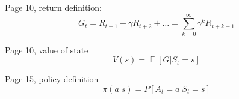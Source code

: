 \documentclass{article}
\DeclareMathOperator{\E}{\mathbb{E}}
\begin{document}
Page 10, return definition:
\begin{equation*}
G_t = R_{t+1}+\gamma R_{t+2}+\ldots = \sum^{\infty}_{k=0}{\gamma^kR_{t+k+1}}  
\end{equation*}

Page 10, value of state
\begin{equation*}
V(s) = \E[G|S_t=s]
\end{equation*}


Page 15, policy definition
\begin{equation*}
  \pi(a|s)=P[A_t=a|S_t=s]
\end{equation*}
\end{document}

